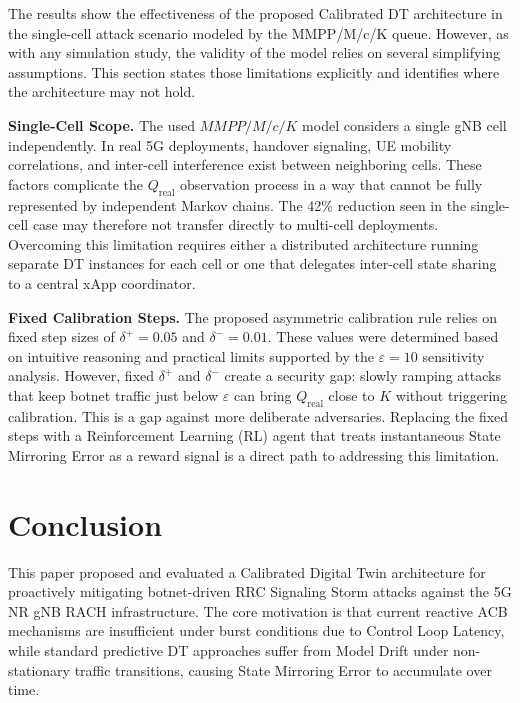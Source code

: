\documentclass[conference]{IEEEtran}
\newcommand{\qreal}{Q_{\mathrm{real}}}
\begin{document}
The results show the effectiveness of the proposed Calibrated DT architecture in the single-cell attack scenario modeled by the MMPP/M/c/K queue. However, as with any simulation study, the validity of the model relies on several simplifying assumptions. This section states those limitations explicitly and identifies where the architecture may not hold.

\textbf{Single-Cell Scope.} The used $MMPP/M/c/K$ model considers a single gNB cell independently. In real 5G deployments, handover signaling, UE mobility correlations, and inter-cell interference exist between neighboring cells. These factors complicate the $\qreal$ observation process in a way that cannot be fully represented by independent Markov chains. The 42\% reduction seen in the single-cell case may therefore not transfer directly to multi-cell deployments. Overcoming this limitation requires either a distributed architecture running separate DT instances for each cell or one that delegates inter-cell state sharing to a central xApp coordinator.

\textbf{Fixed Calibration Steps.} The proposed asymmetric calibration rule relies on fixed step sizes of $\delta^{+} = 0.05$ and $\delta^{-} = 0.01$. These values were determined based on intuitive reasoning and practical limits supported by the $\varepsilon = 10$ sensitivity analysis. However, fixed $\delta^{+}$ and $\delta^{-}$ create a security gap: slowly ramping attacks that keep botnet traffic just below $\varepsilon$ can bring $\qreal$ close to $K$ without triggering calibration. This is a gap against more deliberate adversaries. Replacing the fixed steps with a Reinforcement Learning (RL) agent that treats instantaneous State Mirroring Error as a reward signal is a direct path to addressing this limitation.

\section{Conclusion}

This paper proposed and evaluated a Calibrated Digital Twin architecture for proactively mitigating botnet-driven RRC Signaling Storm attacks against the 5G NR gNB RACH infrastructure. The core motivation is that current reactive ACB mechanisms are insufficient under burst conditions due to Control Loop Latency, while standard predictive DT approaches suffer from Model Drift under non-stationary traffic transitions, causing State Mirroring Error to accumulate over time.
\end{document}
